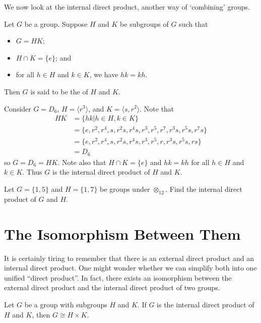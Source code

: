 We now look at the internal direct product, another way of `combining' groups.

\begin{definition}
    Let $G$ be a group. Suppose $H$ and $K$ be subgroups of $G$ such that
    \begin{itemize}
        \item $G = HK$;
        \item $H \cap K = \{e\}$; and
        \item for all $h \in H$ and $k \in K$, we have $hk = kh$.
    \end{itemize}
    Then $G$ is said to be the  of $H$ and $K$.
\end{definition}

\begin{example}
    Consider $G = D_6$, $H = \langle r^3 \rangle$, and $K = \langle s, r^2 \rangle$. Note that
    \begin{align*}
        HK &= \{hk \vert h \in H, k \in K\}\\
        &= \{e, r^2, r^4, s, r^2s, r^4s, r^3, r^5, r^7, r^3s, r^5s, r^7s\}\\
        &= \{e, r^2, r^4, s, r^2s, r^4s, r^3, r^5, r, r^3s, r^5s, rs\}\\
        &= D_6
    \end{align*}
    so $G = D_6 = HK$. Note also that $H \cap K = \{e\}$ and $hk = kh$ for all $h \in H$ and $k \in K$. Thus $G$ is the internal direct product of $H$ and $K$.
\end{example}

\begin{exercise}
    Let $G = \{1, 5\}$ and $H = \{1, 7\}$ be groups under $\otimes_{12}$. Find the internal direct product of $G$ and $H$.
\end{exercise}

\section{The Isomorphism Between Them}
It is certainly tiring to remember that there is an external direct product and an internal direct product. One might wonder whether we can simplify both into one unified ``direct product''. In fact, there exists an isomorphism between the external direct product and the internal direct product of two groups.

\begin{theorem}\label{thrm-direct-product-equivalence}
    Let $G$ be a group with subgroups $H$ and $K$. If $G$ is the internal direct product of $H$ and $K$, then $G \cong H \times K$.
\end{theorem}

